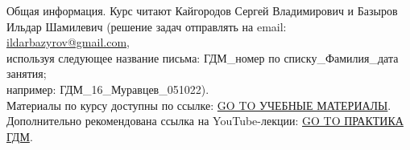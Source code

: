 \documentclass[main.tex]{subfiles}
\begin{document}
Общая информация. Курс читают Кайгородов Сергей Владимирович и Базыров Ильдар Шамилевич (решение задач отправлять на email: \href{mailto:ildarbazyrov@gmail.com}{ildarbazyrov@gmail.com},\\
используя следующее название письма: ГДМ\_номер по списку\_Фамилия\_дата занятия;\\
например: ГДМ\_16\_Муравцев\_051022).\\
Материалы по курсу доступны по ссылке: \href{https://csspbstu-my.sharepoint.com/:f:/g/personal/muravtsev_aa_edu_spbstu_ru/Epiacj6WFMBHqIF6E3YQgCMB7yi5NAA1ycqFLqrTZMhJ4w?e=i2agP0}{GO TO УЧЕБНЫЕ МАТЕРИАЛЫ}.\\
Дополнительно рекомендована ссылка на YouTube-лекции: \href{https://youtube.com/playlist?list=PLDW64ZxU0_y5QCvZ048VptkQPoKJZPdEc}{GO TO ПРАКТИКА ГДМ}.
\end{document}
